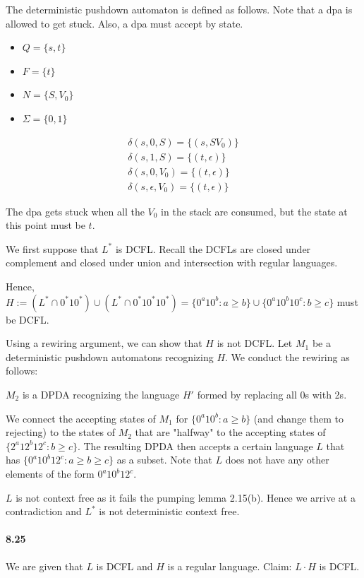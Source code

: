 \documentclass{article}
\begin{document}
The deterministic pushdown automaton is defined as follows. Note that a dpa is allowed to get stuck. Also, a dpa must accept by state.

\begin{itemize}
	\item $Q=\{s,t\}$
	\item $F=\{t\}$
	\item $N=\{S, V_0\}$
	\item $\Sigma = \{0,1\}$
\end{itemize}

\begin{align*}
	\delta(s,0,S) = \{(s, SV_0)\}\\
	\delta(s,1,S) = \{(t,\epsilon)\}\\
	\delta(s,0,V_0) = \{(t,\epsilon)\}\\
	\delta(s,\epsilon,V_0) = \{(t,\epsilon)\}
\end{align*}

The dpa gets stuck when all the $V_0$ in the stack are consumed, but the state at this point must be $t$.


We first suppose that $L^*$ is DCFL. Recall the DCFLs are closed under complement and closed under union and intersection with regular languages.

Hence, $H:=(L^*\cap 0^*10^*) \cup (L^*\cap 0^*10^*10^*) = \{0^a10^b : a\geq b\}\cup \{0^a10^b10^c : b\geq c\}$ must be DCFL.

Using a rewiring argument, we can show that $H$ is not DCFL. Let $M_1$ be a deterministic pushdown automatons recognizing $H$. We conduct the rewiring as follows:

$M_2$ is a DPDA recognizing the language $H'$ formed by replacing all 0s with 2s.

We connect the accepting states of $M_1$ for $\{0^a10^b : a\geq b\}$ (and change them to rejecting) to the states of $M_2$ that are "halfway" to the accepting states of $\{2^a12^b12^c : b\geq c\}$. The resulting DPDA then accepts a certain language $L$ that has $\{0^a10^b12^c : a\geq b\geq c\}$ as a subset. Note that $L$ does not have any other elements of the form $0^a10^b12^c$.

$L$ is not context free as it fails the pumping lemma 2.15(b). Hence we arrive at a contradiction and $L^*$ is not deterministic context free.
 
 
\paragraph{8.25} We are given that $L$ is DCFL and $H$ is a regular language. Claim: $L\cdot H$ is DCFL.
\end{document}

